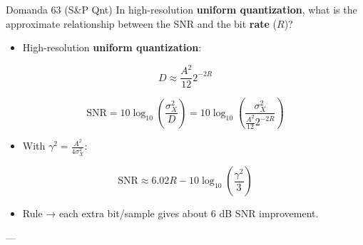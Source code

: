 \begin{questionbox}{Domanda 63}
(S\&P Qnt) In high-resolution \textbf{uniform \textbf{quantization}}, what is the approximate relationship between the SNR and the bit \textbf{rate} ($R$)?
\end{questionbox}


\begin{itemize}
  \item High-resolution \textbf{uniform \textbf{quantization}}:
\end{itemize}


$$
D \approx \frac{A^2}{12}2^{-2R}
$$



$$
\text{SNR}
=10\log_{10}\left(\frac{\sigma_X^2}{D}\right)
=10\log_{10}\left(\frac{\sigma_X^2}{\frac{A^2}{12}2^{-2R}}\right)
$$


\begin{itemize}
  \item With $\gamma^2=\frac{A^2}{4\sigma_X^2}$:
\end{itemize}


$$
\text{SNR}\approx 6.02R - 10\log_{10}\left(\frac{\gamma^2}{3}\right)
$$


\begin{itemize}
  \item Rule → each extra bit/sample gives about $6$ dB SNR improvement.
\end{itemize}

---


